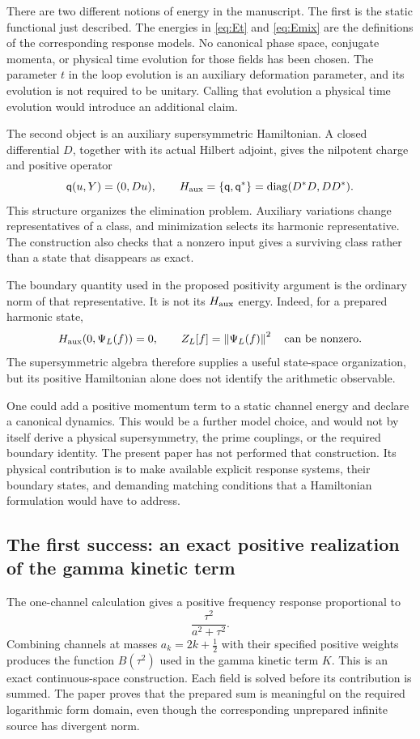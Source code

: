 \documentclass[11pt]{article}
\numberwithin{equation}{section}
\theoremstyle{definition}
\theoremstyle{remark}
\newcommand{\qq}{\mathsf q}
\newcommand{\norm}[1]{\left\lVert#1\right\rVert}
\begin{document}
There are two different notions of energy in the manuscript. The first is the static functional just described. The energies in \eqref{eq:Et} and \eqref{eq:Emix} are the definitions of the corresponding response models. No canonical phase space, conjugate momenta, or physical time evolution for those fields has been chosen. The parameter $t$ in the loop evolution is an auxiliary deformation parameter, and its evolution is not required to be unitary. Calling that evolution a physical time evolution would introduce an additional claim.

The second object is an auxiliary supersymmetric Hamiltonian. A closed differential $D$, together with its actual Hilbert adjoint, gives the nilpotent charge and positive operator
\[
\qq(u,Y)=(0,Du),\qquad
H_{\rm aux}=\{\qq,\qq^*\}
=\operatorname{diag}(D^*D,DD^*).
\]
This structure organizes the elimination problem. Auxiliary variations change representatives of a class, and minimization selects its harmonic representative. The construction also checks that a nonzero input gives a surviving class rather than a state that disappears as exact.

The boundary quantity used in the proposed positivity argument is the ordinary norm of that representative. It is not its $H_{\rm aux}$ energy. Indeed, for a prepared harmonic state,
\[
H_{\rm aux}(0,\Psi_L(f))=0,
\qquad
Z_L[f]=\norm{\Psi_L(f)}^2
\quad\hbox{can be nonzero}.
\]
The supersymmetric algebra therefore supplies a useful state-space organization, but its positive Hamiltonian alone does not identify the arithmetic observable.

One could add a positive momentum term to a static channel energy and declare a canonical dynamics. This would be a further model choice, and would not by itself derive a physical supersymmetry, the prime couplings, or the required boundary identity. The present paper has not performed that construction. Its physical contribution is to make available explicit response systems, their boundary states, and demanding matching conditions that a Hamiltonian formulation would have to address.

\subsection*{The first success: an exact positive realization of the gamma kinetic term}
The one-channel calculation gives a positive frequency response proportional to
\[
\frac{\tau^2}{a^2+\tau^2}.
\]
Combining channels at masses $a_k=2k+\tfrac12$ with their specified positive weights produces the function $B(\tau^2)$ used in the gamma kinetic term $K$. This is an exact continuous-space construction. Each field is solved before its contribution is summed. The paper proves that the prepared sum is meaningful on the required logarithmic form domain, even though the corresponding unprepared infinite source has divergent norm.
\end{document}
